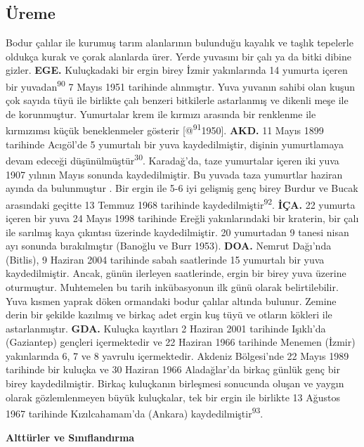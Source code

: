 \documentclass[
  letterpaper,
  DIV=11,
  numbers=noendperiod]{scrreprt}
\begin{document}
\hypertarget{uxfcreme-38}{%
\subsection{\texorpdfstring{\textbf{Üreme}}{Üreme}}\label{uxfcreme-38}}

Bodur çalılar ile kurumuş tarım alanlarının bulunduğu kayalık ve taşlık
tepelerle oldukça kurak ve çorak alanlarda ürer. Yerde yuvasını bir çalı
ya da bitki dibine gizler. \textbf{EGE.} Kuluçkadaki bir ergin birey
İzmir yakınlarında 14 yumurta içeren bir yuvadan\textsuperscript{90} 7
Mayıs 1951 tarihinde alınmıştır. Yuva yuvanın sahibi olan kuşun çok
sayıda tüyü ile birlikte çalı benzeri bitkilerle astarlanmış ve dikenli
meşe ile de korunmuştur. Yumurtalar krem ile kırmızı arasında bir
renklenme ile kırmızımsı küçük beneklenmeler gösterir
{[}@\textsuperscript{91}1950{]}. \textbf{AKD.} 11 Mayıs 1899 tarihinde
Acıgöl'de 5 yumurtalı bir yuva kaydedilmiştir, dişinin yumurtlamaya
devam edeceği düşünülmüştür\textsuperscript{30}. Karadağ'da, taze
yumurtalar içeren iki yuva 1907 yılının Mayıs sonunda kaydedilmiştir. Bu
yuvada taza yumurtlar haziran ayında da bulunmuştur . Bir ergin ile 5-6
iyi gelişmiş genç birey Burdur ve Bucak arasındaki geçitte 13 Temmuz
1968 tarihinde kaydedilmiştir\textsuperscript{92}. \textbf{İÇA.} 22
yumurta içeren bir yuva 24 Mayıs 1998 tarihinde Ereğli yakınlarındaki
bir kraterin, bir çalı ile sarılmış kaya çıkıntısı üzerinde
kaydedilmiştir. 20 yumurtadan 9 tanesi nisan ayı sonunda bırakılmıştır
(Banoğlu ve Burr 1953). \textbf{DOA.} Nemrut Dağı'nda (Bitlis), 9
Haziran 2004 tarihinde sabah saatlerinde 15 yumurtalı bir yuva
kaydedilmiştir. Ancak, günün ilerleyen saatlerinde, ergin bir birey yuva
üzerine oturmuştur. Muhtemelen bu tarih inkübasyonun ilk günü olarak
belirtilebilir. Yuva kısmen yaprak döken ormandaki bodur çalılar altında
bulunur. Zemine derin bir şekilde kazılmış ve birkaç adet ergin kuş tüyü
ve otların kökleri ile astarlanmıştır. \textbf{GDA.} Kuluçka kayıtları 2
Haziran 2001 tarihinde Işıklı'da (Gaziantep) gençleri içermektedir ve 22
Haziran 1966 tarihinde Menemen (İzmir) yakınlarında 6, 7 ve 8 yavrulu
içermektedir. Akdeniz Bölgesi'nde 22 Mayıs 1989 tarihinde bir kuluçka ve
30 Haziran 1966 Aladağlar'da birkaç günlük genç bir birey
kaydedilmiştir. Birkaç kuluçkanın birleşmesi sonucunda oluşan ve yaygın
olarak gözlemlenmeyen büyük kuluçkalar, tek bir ergin ile birlikte 13
Ağustos 1967 tarihinde Kızılcahamam'da (Ankara)
kaydedilmiştir\textsuperscript{93}.

\textbf{Alttürler ve Sınıflandırma}
\end{document}
